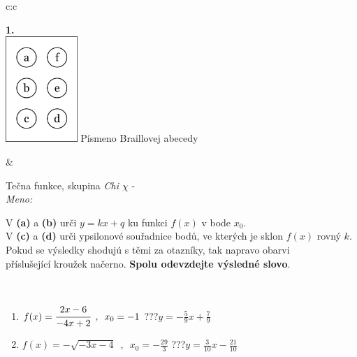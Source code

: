 \documentclass[10pt]{report}
\begin{document}
\begin{tabular}{c:c}
\begin{minipage}[c][104.5mm][t]{0.5\linewidth}
\begin{center}
\begin{minipage}{0.20\linewidth}
\begin{center}
{\Huge\bfseries 1.} \\[2mm]
\includegraphics[height=40mm]{../images/braille.png}
{\small Písmeno Braillovej abecedy}
\end{center}
\end{minipage}
\end{center}
\end{minipage}
&
\begin{minipage}[c][104.5mm][t]{0.5\linewidth}
\begin{center}
\vspace{7mm}
{\huge Tečna funkce, skupina \textit{Chi $\chi$} -}\\[5mm]
\textit{Meno:}\phantom{xxxxxxxxxxxxxxxxxxxxxxxxxxxxxxxxxxxxxxxxxxxxxxxxxxxxxxxxxxxxxxxxx}\\[5mm]
\begin{minipage}{0.95\linewidth}
\begin{center}
V \textbf{(a)} a \textbf{(b)} urči  $y = kx + q$ ku funkci $f(x)$ v bode $x_0$.\\V \textbf{(c)} a \textbf{(d)} urči ypsilonové souřadnice bodů, ve kterých je sklon $f(x)$ rovný $k$.\\Pokud se výsledky shodujú s těmi za otazníky, tak napravo obarvi\\příslušející kroužek načerno. \textbf{Spolu odevzdejte výsledné slovo}.
\end{center}
\end{minipage}
\\[1mm]
\begin{minipage}{0.79\linewidth}
\begin{center}
\begin{varwidth}{\linewidth}
\begin{enumerate}
\small
\item $f(x)=\cfrac{2x-6}{-4x+2}\enspace , \enspace x_0=-1$\quad \dotfill\; ???\;\dotfill \quad $y = -\frac{5}{9}x+\frac{7}{9}$
\item $f(x)=-\sqrt{-3x-4}\enspace , \enspace x_0=-\frac{29}{3}$\quad \dotfill\; ???\;\dotfill \quad $y = \frac{3}{10}x-\frac{21}{10}$

\end{enumerate}
\end{varwidth}
\end{center}
\end{minipage}
\end{center}
\end{minipage}
\end{tabular}
\end{document}

